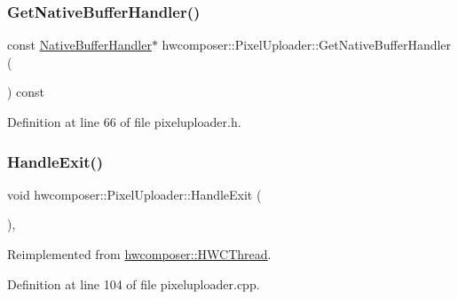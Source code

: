 \subsubsection{\texorpdfstring{Get\+Native\+Buffer\+Handler()}{GetNativeBufferHandler()}}
{\footnotesize\ttfamily const \mbox{\hyperlink{classhwcomposer_1_1NativeBufferHandler}{Native\+Buffer\+Handler}}$\ast$ hwcomposer\+::\+Pixel\+Uploader\+::\+Get\+Native\+Buffer\+Handler (\begin{DoxyParamCaption}{ }\end{DoxyParamCaption}) const\hspace{0.3cm}{\ttfamily [inline]}}



Definition at line 66 of file pixeluploader.\+h.


\begin{DoxyCode}{0}
\end{DoxyCode}
\mbox{\label{classhwcomposer_1_1PixelUploader_ae6bfd528de70bc53d8eb30eb76b8d8fd}} 
\subsubsection{\texorpdfstring{Handle\+Exit()}{HandleExit()}}
{\footnotesize\ttfamily void hwcomposer\+::\+Pixel\+Uploader\+::\+Handle\+Exit (\begin{DoxyParamCaption}{ }\end{DoxyParamCaption})\hspace{0.3cm}{\ttfamily [override]}, {\ttfamily [virtual]}}



Reimplemented from \mbox{\hyperlink{classhwcomposer_1_1HWCThread_a39a94bd0b12451fe3060729787921cbf}{hwcomposer\+::\+H\+W\+C\+Thread}}.



Definition at line 104 of file pixeluploader.\+cpp.


\begin{DoxyCode}{0}
\end{DoxyCode}
\mbox{\label{classhwcomposer_1_1PixelUploader_a73abd205b50c5cdcc693886536553889}} 
